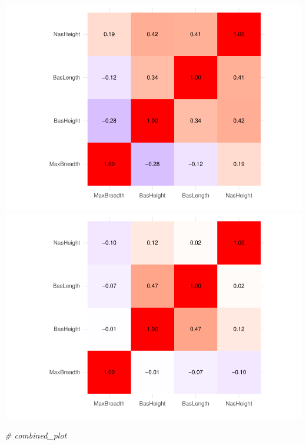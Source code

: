 \documentclass[
]{article}
\newenvironment{Shaded}{\begin{snugshade}}{\end{snugshade}}
\newcommand{\CommentTok}[1]{\textcolor[rgb]{0.56,0.35,0.01}{\textit{#1}}}
\begin{document}
\includegraphics{CA1_files/figure-latex/unnamed-chunk-6-4.pdf}
\includegraphics{CA1_files/figure-latex/unnamed-chunk-6-5.pdf}

\begin{Shaded}
\begin{Highlighting}[]
\CommentTok{\# combined\_plot}
\end{Highlighting}
\end{Shaded}
\end{document}
